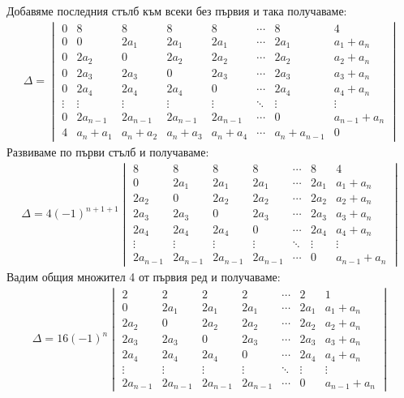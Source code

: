 \documentclass[a4paper, 12pt, oneside]{article}
\begin{document}
Добавяме последния стълб към всеки без първия и така получаваме:
\begin{align*}
\Delta = \begin{vmatrix}
    0 & 8 & 8 & 8 & 8 & \cdots & 8  & 4 \\
    0 & 0 & 2a_1 & 2a_1 & 2a_1 & \cdots & 2a_1 & a_1 + a_n \\
    0 & 2a_2 & 0 & 2a_2 & 2a_2 & \cdots & 2a_2 & a_2 + a_n \\
    0 & 2a_3 & 2a_3 & 0 & 2a_3 & \cdots & 2a_3 & a_3 + a_n \\
    0 & 2a_4 & 2a_4 & 2a_4 & 0 & \cdots & 2a_4 & a_4 + a_n \\
    \vdots & \vdots & \vdots & \vdots & \vdots & \ddots & \vdots & \vdots \\
    0 & 2a_{n - 1} & 2a_{n - 1} & 2a_{n - 1} & 2a_{n - 1} & \cdots & 0 & a_{n - 1} + a_n \\
    4 & a_n + a_1 & a_n + a_2 & a_n + a_3 & a_n + a_4 & \cdots & a_n + a_{n - 1} & 0
\end{vmatrix}
\end{align*}
Развиваме по първи стълб и получаваме: \\
\begin{align*}
\Delta = 4(-1)^{n + 1 + 1}\begin{vmatrix}
    8 & 8 & 8 & 8 & \cdots & 8  & 4 \\
    0 & 2a_1 & 2a_1 & 2a_1 & \cdots & 2a_1 & a_1 + a_n \\
    2a_2 & 0 & 2a_2 & 2a_2 & \cdots & 2a_2 & a_2 + a_n \\
    2a_3 & 2a_3 & 0 & 2a_3 & \cdots & 2a_3 & a_3 + a_n \\
    2a_4 & 2a_4 & 2a_4 & 0 & \cdots & 2a_4 & a_4 + a_n \\
    \vdots & \vdots & \vdots & \vdots & \ddots & \vdots & \vdots \\
    2a_{n - 1} & 2a_{n - 1} & 2a_{n - 1} & 2a_{n - 1} & \cdots & 0 & a_{n - 1} + a_n
\end{vmatrix}
\end{align*}
Вадим общия множител 4 от първия ред и получаваме:
\begin{align*}
\Delta = 16(-1)^n\begin{vmatrix}
    2 & 2 & 2 & 2 & \cdots & 2  & 1 \\
    0 & 2a_1 & 2a_1 & 2a_1 & \cdots & 2a_1 & a_1 + a_n \\
    2a_2 & 0 & 2a_2 & 2a_2 & \cdots & 2a_2 & a_2 + a_n \\
    2a_3 & 2a_3 & 0 & 2a_3 & \cdots & 2a_3 & a_3 + a_n \\
    2a_4 & 2a_4 & 2a_4 & 0 & \cdots & 2a_4 & a_4 + a_n \\
    \vdots & \vdots & \vdots & \vdots & \ddots & \vdots & \vdots \\
    2a_{n - 1} & 2a_{n - 1} & 2a_{n - 1} & 2a_{n - 1} & \cdots & 0 & a_{n - 1} + a_n
\end{vmatrix}
\end{align*}
\end{document}

